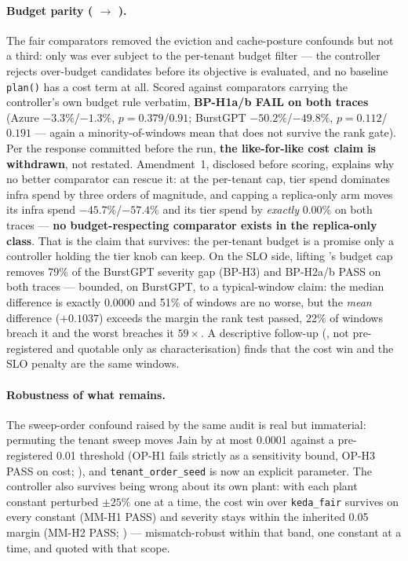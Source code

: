 \paragraph{Budget parity ( $\to$
).} The fair comparators removed the
eviction and cache-posture confounds but not a third: only \jcac{} was
ever subject to the per-tenant budget filter --- the controller rejects
over-budget candidates before its objective is evaluated, and no baseline
\texttt{plan()} has a cost term at all. Scored against comparators carrying
the controller's own budget rule verbatim, \textbf{BP-H1a/b FAIL on both
traces} (Azure $-3.3\%$/$-1.3\%$, $p{=}0.379$/$0.91$; BurstGPT
$-50.2\%$/$-49.8\%$, $p{=}0.112$/$0.191$ --- again a minority-of-windows
mean that does not survive the rank gate). Per the response committed
before the run, \textbf{the like-for-like cost claim is withdrawn}, not
restated. Amendment~1, disclosed before scoring, explains why no better
comparator can rescue it: at the per-tenant cap, tier spend dominates infra
spend by three orders of magnitude, and capping a replica-only arm moves
its infra spend $-45.7\%$/$-57.4\%$ and its tier spend by \emph{exactly}
0.00\% on both traces --- \textbf{no budget-respecting comparator exists in
the replica-only class}. That is the claim that survives: the per-tenant
budget is a promise only a controller holding the tier knob can keep. On
the SLO side, lifting \jcac{}'s budget cap removes 79\% of the BurstGPT
severity gap (BP-H3) and BP-H2a/b PASS on both traces --- bounded, on
BurstGPT, to a typical-window claim: the median difference is exactly
0.0000 and 51\% of windows are no worse, but the \emph{mean} difference
($+0.1037$) exceeds the margin the rank test passed, 22\% of windows breach
it and the worst breaches it $59\times$. A descriptive follow-up
(, not pre-registered and quotable
only as characterisation) finds that the cost win and the SLO penalty are
the same windows.

\paragraph{Robustness of what remains.} The sweep-order confound raised by
the same audit is real but immaterial: permuting the tenant sweep moves
Jain by at most 0.0001 against a pre-registered 0.01 threshold (OP-H1 fails
strictly as a sensitivity bound, OP-H3 PASS on cost;
), and \texttt{tenant\_order\_seed}
is now an explicit parameter. The controller also survives being wrong
about its own plant: with each plant constant perturbed $\pm25\%$ one at a
time, the cost win over \texttt{keda\_fair} survives on every constant
(MM-H1 PASS) and severity stays within the inherited 0.05 margin (MM-H2
PASS; ) --- mismatch-robust within that
band, one constant at a time, and quoted with that scope.

